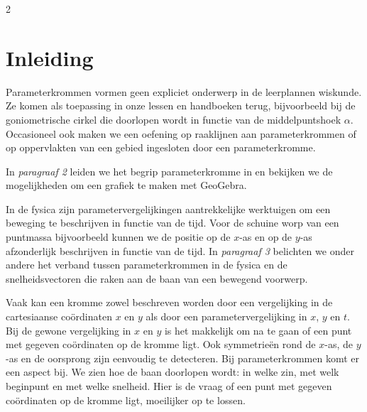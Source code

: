 

\startcontents[inhoudloep]	%

\begin{multicols}{2}
	
	\inhoudstafelloep			%
	
	\section{Inleiding}
	
	Parameterkrommen vormen geen expliciet onderwerp in de leerplannen wiskunde. Ze komen als toepassing in onze lessen en handboeken terug, bijvoorbeeld bij de goniometrische cirkel die doorlopen wordt in functie van de middelpuntshoek $\alpha$. Occasioneel ook maken we een oefening op raaklijnen aan parameterkrommen of op oppervlakten van een gebied ingesloten door een parameterkromme. 
	
	In \emph{paragraaf 2} leiden we het begrip parameterkromme in en bekijken we de mogelijkheden om een grafiek te maken met GeoGebra.
	
	In de fysica zijn parametervergelijkingen aantrekkelijke werktuigen om een beweging te beschrijven in functie van de tijd. Voor de schuine worp van een puntmassa bijvoorbeeld kunnen we de positie op de $x$-as en op de $y$-as afzonderlijk  beschrijven in functie van de tijd. In \emph{paragraaf 3} belichten we onder andere het verband tussen parameterkrommen in de fysica en de snelheidsvectoren die raken aan de baan van een bewegend voorwerp.
	
	Vaak kan een kromme zowel beschreven worden door een vergelijking in de cartesiaanse coördinaten $x$ en $y$ als door een parametervergelijking in $x$, $y$ en $t$. Bij de gewone vergelijking in $x$ en $y$ is het makkelijk om na te gaan of een punt met gegeven coördinaten op de kromme ligt. Ook symmetrieën rond de $x$-as, de $y$-as en de oorsprong zijn eenvoudig te detecteren. Bij parameterkrommen komt er een aspect bij. We zien hoe de baan doorlopen wordt: in welke zin, met welk beginpunt en met welke snelheid. Hier is de vraag of een punt met gegeven coördinaten op de kromme ligt, moeilijker op te lossen. 
	

\end{multicols}
